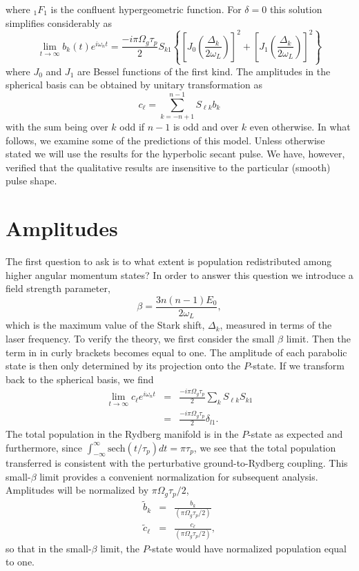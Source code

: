 where $_1F_1$ is the confluent hypergeometric function.
For $\delta = 0$ this solution simplifies considerably as
\begin{equation}
\lim_{t \rightarrow \infty} b_k(t) e^{i \omega_n t}  = 
\frac{ -i\pi \Omega_g \tau_p}{2} S_{k1}
\left\{\left[J_0\left(\frac{\Delta_k}{2 \omega_L}\right)\right]^2+
       \left[J_1\left(\frac{\Delta_k}{2 \omega_L}\right)\right]^2 \right\}
\label{delta0}
\end{equation}
where $J_0$ and $J_1$ are Bessel functions of the first kind.
The amplitudes in the spherical basis can be obtained by unitary
transformation as 
\begin{equation}
c_\ell = \sum_{k=-n+1}^{n-1} S_{\ell k} b_k
\label{unitary}
\end{equation}
with the sum being over $k$ odd if $n-1$ is odd and over $k$ even otherwise. 
In what follows, we examine some of the predictions of this model.  Unless
otherwise stated we will use the results for the hyperbolic secant pulse.  We
have, however, verified that the qualitative results are insensitive to the
particular (smooth) pulse shape.


\section{Amplitudes}
\hspace{\parindent}  The first question to ask is to what extent is population
redistributed among higher angular momentum states?  In order to answer this
question we introduce a field strength parameter,
\begin{equation}
\beta = \frac{3 n (n-1) E_0}{2 \omega_L},
\end{equation}
which is the maximum value of the Stark shift, $\Delta_k$, measured in terms
of the laser frequency.  To verify the theory, we first consider the small
$\beta$ limit.  Then the term in  in curly brackets becomes equal
to one.  The amplitude of each parabolic state is then only determined by its
projection onto the $P$-state.  If we transform back to the spherical basis,
we find
\begin{eqnarray}
\lim_{t \rightarrow \infty} c_\ell e^{i \omega_n t} &=&
\frac{-i \pi \Omega_g \tau_p}{2} \sum_{k} S_{\ell k} S_{k1} \nonumber \\
& = &  \frac{-i \pi \Omega_g \tau_p}{2} \delta_{l1}.
\end{eqnarray}
The total population in the Rydberg manifold is in the
$P$-state as expected and furthermore, since
${\displaystyle \int}_{-\infty}^{\infty}\mathrm{sech}(t/\tau_p) dt = \pi \tau_p$,
we see that the total population transferred is consistent with the perturbative
ground-to-Rydberg coupling.  This small-$\beta$ limit provides a convenient
normalization for subsequent analysis.  Amplitudes will be normalized by $\pi
\Omega_g \tau_p/2$,
\begin{eqnarray}
\tilde{b}_k &=& \frac{b_k}{\left(\pi \Omega_g \tau_p/2\right)} \\
\tilde{c}_{\ell} &=& \frac{c_{\ell}}{\left(\pi \Omega_g \tau_p/2\right)},
\label{normalize}
\end{eqnarray}
so that in the small-$\beta$ limit, the $P$-state would have normalized
population equal to one.

